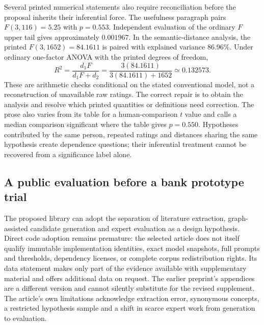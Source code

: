 Several printed numerical statements also require reconciliation before the proposal inherits their inferential force. The usefulness paragraph pairs $F(3,116)=5.25$ with $p=0.553$. Independent evaluation of the ordinary $F$ upper tail gives approximately $0.001967$. In the semantic-distance analysis, the printed $F(3,1652)=84.1611$ is paired with explained variance 86.96\%. Under ordinary one-factor ANOVA with the printed degrees of freedom,
\begin{equation}
 R^2=\frac{d_1F}{d_1F+d_2}
     =\frac{3(84.1611)}{3(84.1611)+1652}
     \simeq 0.132573.
 \label{exec20:hypothesis-anova}
\end{equation}
These are arithmetic checks conditional on the stated conventional model, not a reconstruction of unavailable raw ratings. The correct repair is to obtain the analysis and resolve which printed quantities or definitions need correction. The prose also varies from its table for a human-comparison $t$ value and calls a median comparison significant where the table gives $p=0.550$. Hypotheses contributed by the same person, repeated ratings and distances sharing the same hypothesis create dependence questions; their inferential treatment cannot be recovered from a significance label alone.~\citep{exec20_hypothesis_generation,exec20_hypothesis_reference}

\subsection{A public evaluation before a bank prototype trial}
\label{exec20:hypothesis-prototype}
The proposed library can adopt the separation of literature extraction, graph-assisted candidate generation and expert evaluation as a design hypothesis. Direct code adoption remains premature: the selected article does not itself qualify immutable implementation identities, exact model snapshots, full prompts and thresholds, dependency licenses, or complete corpus redistribution rights. Its data statement makes only part of the evidence available with supplementary material and offers additional data on request. The earlier preprint's appendices are a different version and cannot silently substitute for the revised supplement. The article's own limitations acknowledge extraction error, synonymous concepts, a restricted hypothesis sample and a shift in scarce expert work from generation to evaluation.~\citep{exec20_hypothesis_generation}

